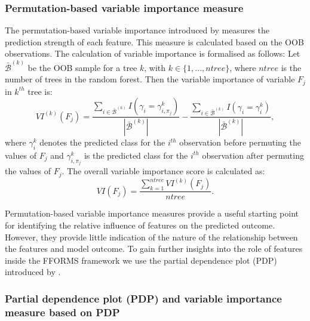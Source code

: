 \documentclass[11pt,a4paper,]{article}
\begin{document}
\hypertarget{permutation-based-variable-importance-measure}{%
\subsubsection{Permutation-based variable importance measure}\label{permutation-based-variable-importance-measure}}

The permutation-based variable importance introduced by \textcite{breiman2001random} measures the prediction
strength of each feature. This measure is calculated based on the OOB observations. The calculation of variable importance is formalised as follows: Let \(\bar{\mathcal{B}}^{(k)}\) be the OOB sample for a tree \(k\), with \(k\in \{1,...,ntree\}\), where \(ntree\) is the number of trees in the random forest. Then the variable importance of variable \(F_{j}\) in \(k^{th}\) tree is:
\[VI^{(k)}(F_{j})=\frac{\sum_{i\in \bar{\mathcal{B}}^{(k)}}I(\gamma_{i}=\gamma_{i,\pi_{j}}^{k})}{|\bar{\mathcal{B}}^{(k)}|}-\frac{\sum_{i\in \bar{\mathcal{B}}^{(k)}}I(\gamma_{i}=\gamma_{i}^{k})}{|\bar{\mathcal{B}}^{(k)}|},\]
where \(\gamma_{i}^{k}\) denotes the predicted class for the \(i^{th}\) observation before permuting the values of \(F_{j}\) and \(\gamma_{i, \pi_{j}}^{k}\) is the predicted class for the \(i^{th}\) observation after permuting the values of \(F_{j}\). The overall variable importance score is calculated as:
\[VI(F_{j})=\frac{\sum_{k=1}^{ntree}VI^{(k)}(F_{j})}{ntree}.\]

Permutation-based variable importance measures provide a useful starting point for identifying the relative influence of features on the predicted outcome. However, they provide little indication of the nature of the relationship between the features and model outcome. To gain further insights into the role of features inside the FFORMS framework we use the partial dependence plot (PDP) introduced by \textcite{friedman2008predictive}.

\hypertarget{partial-dependence-plot-pdp-and-variable-importance-measure-based-on-pdp}{%
\subsubsection{Partial dependence plot (PDP) and variable importance measure based on PDP}\label{partial-dependence-plot-pdp-and-variable-importance-measure-based-on-pdp}}
\end{document}
